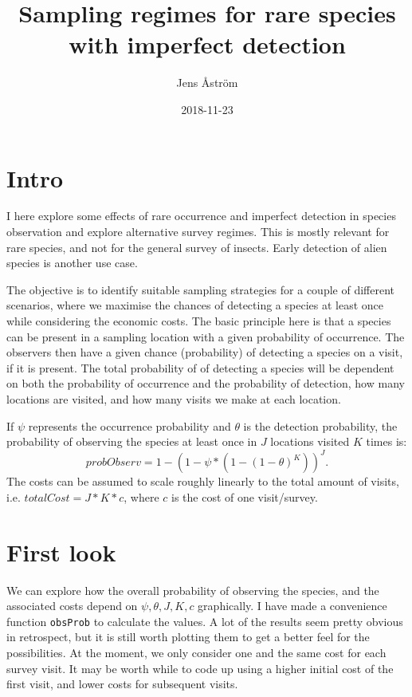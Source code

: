 \documentclass[]{article}
\title{Sampling regimes for rare species with imperfect detection}
\author{Jens Åström}
\date{2018-11-23}
\begin{document}
\maketitle

\section{Intro}\label{intro}

I here explore some effects of rare occurrence and imperfect detection
in species observation and explore alternative survey regimes. This is
mostly relevant for rare species, and not for the general survey of
insects. Early detection of alien species is another use case.

The objective is to identify suitable sampling strategies for a couple
of different scenarios, where we maximise the chances of detecting a
species at least once while considering the economic costs. The basic
principle here is that a species can be present in a sampling location
with a given probability of occurrence. The observers then have a given
chance (probability) of detecting a species on a visit, if it is
present. The total probability of of detecting a species will be
dependent on both the probability of occurrence and the probability of
detection, how many locations are visited, and how many visits we make
at each location.

If \(\psi\) represents the occurrence probability and \(\theta\) is the
detection probability, the probability of observing the species at least
once in \(J\) locations visited \(K\) times is:
\[probObserv = 1 - (1 - \psi * (1 - (1 - \theta)^K))^J.\] The costs can
be assumed to scale roughly linearly to the total amount of visits, i.e.
\(totalCost = J * K * c\), where \(c\) is the cost of one visit/survey.

\section{First look}\label{first-look}

We can explore how the overall probability of observing the species, and
the associated costs depend on \(\psi, \theta, J, K, c\) graphically. I
have made a convenience function \texttt{obsProb} to calculate the
values. A lot of the results seem pretty obvious in retrospect, but it
is still worth plotting them to get a better feel for the possibilities.
At the moment, we only consider one and the same cost for each survey
visit. It may be worth while to code up using a higher initial cost of
the first visit, and lower costs for subsequent visits.
\end{document}
